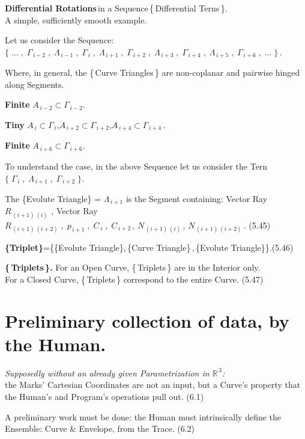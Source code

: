 \documentclass[12pt]{article} %
\begin{document}
{\noindent \textbf{Differential Rotations}\,in a Sequence\,\{\,Differential Terns\,\}.\\A simple, sufficiently smooth example.

\noindent Let us consider the Sequence:\\ $\{\;\ldots\;,\;\Gamma_{\,i-2}\;,\;\Lambda_{\,i-1}\;,\;\Gamma_{\,i}\;,\;\Lambda_{\,i+1}\;,\;\Gamma_{\,i+2}\;,\;\Lambda_{\,i+3}\;,\;\Gamma_{\,i+4}\;,\;\Lambda_{\,i+5}\;,\;\Gamma_{\,i+6}\;,\;\ldots\;\}$\,. 

\noindent Where, in general, the \{\,Curve Triangles\,\} are non-coplanar and pairwise hinged along Segments.
 
\noindent \textbf{Finite} $A_{\,i-2} \subset \Gamma_{\,i-2}$\;.

\noindent \textbf{Tiny}\; $A_{\,i} \subset \Gamma_{\,i}$\;,\;$A_{\,i+2} \subset \Gamma_{\,i+2}$\;,\;$A_{\,i+4} \subset \Gamma_{\,i+4}$\,.

\noindent \textbf{Finite} $A_{\,i+6} \subset \Gamma_{\,i+6}$\;. 

\noindent To understand the case, in the above Sequence let us consider the Tern $\{\;\Gamma_{\,i}\;,\;\Lambda_{\,i+1}\;,\;\Gamma_{\,i+2}\;\}$. 
  
\noindent The \{Evolute Triangle\} = $\Lambda_{\,i+1}$ is the Segment containing: Vector Ray $R_{\,(i+1)\,(i)}$ , Vector Ray $R_{\,(i+1)\,(i+2)}\;,\;p_{\,i+1}\;,\;C_{\,i}\;,\; C_{\,i+2}\,,\,N_{\,(i+1)\,(i)}\,,\,N_{\,(i+1)\,(i+2)}$\,. \qquad (5.45) 

\noindent \textbf{\{Triplet\}}=\big\{\{Evolute Triangle\},\,\{Curve Triangle\}\,,\,\{Evolute Triangle\}\big\}.(5.46)

\noindent \textbf{\{\,Triplets\,\}.} For an Open Curve, \{\,Triplets\,\} are in the Interior only.\\For a Closed Curve, \{\,Triplets\,\} correspond to the entire Curve. (5.47) 

\section{Preliminary collection of data, by the Human.}

\noindent \textsl{Supposedly without an already given Parametrization in $\mathbb{R}^{\,3}$:}\\ the Marks' Cartesian Coordinates are not an input, but a Curve's property that the Human's and Program's operations pull out. \qquad \qquad  (6.1)

\noindent A preliminary work must be done:\; the Human must intrinsically define the\\ Ensemble: Curve \& Envelope, from the Trace. \qquad (6.2) 

}
\end{document}
